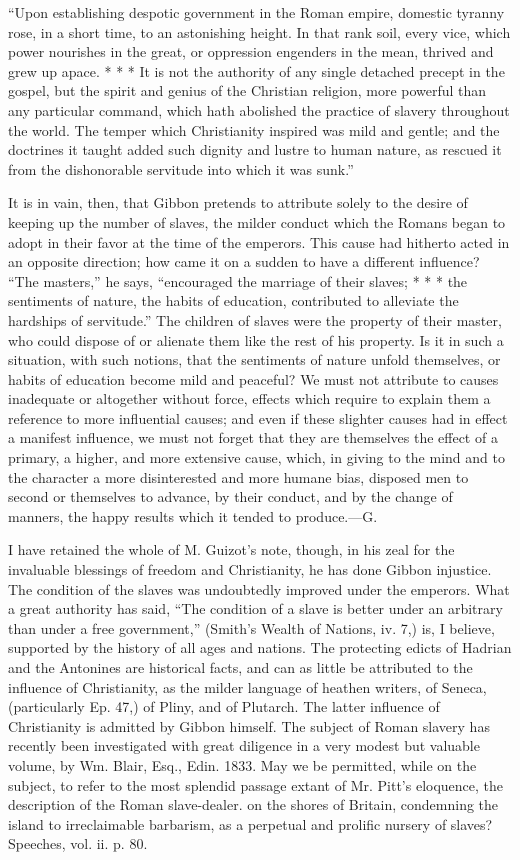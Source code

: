 {“Upon establishing despotic government in the Roman empire,
domestic tyranny rose, in a short time, to an astonishing height.
In that rank soil, every vice, which power nourishes in the
great, or oppression engenders in the mean, thrived and grew up
apace. * * * It is not the authority of any single detached
precept in the gospel, but the spirit and genius of the Christian
religion, more powerful than any particular command, which hath
abolished the practice of slavery throughout the world. The
temper which Christianity inspired was mild and gentle; and the
doctrines it taught added such dignity and lustre to human
nature, as rescued it from the dishonorable servitude into which
it was sunk.”

It is in vain, then, that Gibbon pretends to attribute solely to
the desire of keeping up the number of slaves, the milder conduct
which the Romans began to adopt in their favor at the time of the
emperors. This cause had hitherto acted in an opposite direction;
how came it on a sudden to have a different influence? “The
masters,” he says, “encouraged the marriage of their slaves; * *
* the sentiments of nature, the habits of education, contributed
to alleviate the hardships of servitude.” The children of slaves
were the property of their master, who could dispose of or
alienate them like the rest of his property. Is it in such a
situation, with such notions, that the sentiments of nature
unfold themselves, or habits of education become mild and
peaceful? We must not attribute to causes inadequate or
altogether without force, effects which require to explain them a
reference to more influential causes; and even if these slighter
causes had in effect a manifest influence, we must not forget
that they are themselves the effect of a primary, a higher, and
more extensive cause, which, in giving to the mind and to the
character a more disinterested and more humane bias, disposed men
to second or themselves to advance, by their conduct, and by the
change of manners, the happy results which it tended to
produce.—G.

I have retained the whole of M. Guizot’s note, though, in his
zeal for the invaluable blessings of freedom and Christianity, he
has done Gibbon injustice. The condition of the slaves was
undoubtedly improved under the emperors. What a great authority
has said, “The condition of a slave is better under an arbitrary
than under a free government,” (Smith’s Wealth of Nations, iv.
7,) is, I believe, supported by the history of all ages and
nations. The protecting edicts of Hadrian and the Antonines are
historical facts, and can as little be attributed to the
influence of Christianity, as the milder language of heathen
writers, of Seneca, (particularly Ep. 47,) of Pliny, and of
Plutarch. The latter influence of Christianity is admitted by
Gibbon himself. The subject of Roman slavery has recently been
investigated with great diligence in a very modest but valuable
volume, by Wm. Blair, Esq., Edin. 1833. May we be permitted,
while on the subject, to refer to the most splendid passage
extant of Mr. Pitt’s eloquence, the description of the Roman
slave-dealer. on the shores of Britain, condemning the island to
irreclaimable barbarism, as a perpetual and prolific nursery of
slaves? Speeches, vol. ii. p. 80.

}
